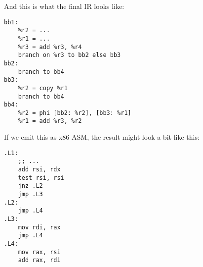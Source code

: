 \documentclass[12pt]{report}
\begin{document}
\noindent And this is what the final IR looks like:
\begin{Verbatim}
bb1:
    %r2 = ...
    %r1 = ...
    %r3 = add %r3, %r4
    branch on %r3 to bb2 else bb3
bb2:
    branch to bb4
bb3:
    %r2 = copy %r1
    branch to bb4
bb4:
    %r2 = phi [bb2: %r2], [bb3: %r1]
    %r1 = add %r3, %r2
\end{Verbatim}

\noindent If we emit this as x86 ASM, the result might look a bit like this:
\begin{Verbatim}
.L1:
    ;; ...
    add rsi, rdx
    test rsi, rsi
    jnz .L2
    jmp .L3
.L2:
    jmp .L4
.L3:
    mov rdi, rax
    jmp .L4
.L4:
    mov rax, rsi
    add rax, rdi
\end{Verbatim}
\end{document}

